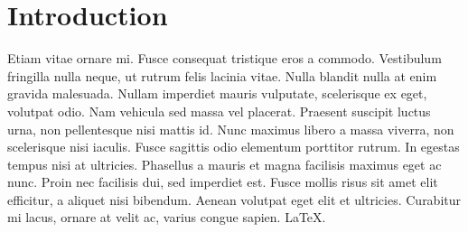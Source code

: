 \section{Introduction}
Etiam vitae ornare mi. Fusce consequat tristique eros a commodo. Vestibulum fringilla nulla neque, ut rutrum felis lacinia vitae. Nulla blandit nulla at enim gravida malesuada. Nullam imperdiet mauris vulputate, scelerisque ex eget, volutpat odio. Nam vehicula sed massa vel placerat. Praesent suscipit luctus urna, non pellentesque nisi mattis id. Nunc maximus libero a massa viverra, non scelerisque nisi iaculis. Fusce sagittis odio elementum porttitor rutrum. In egestas tempus nisi at ultricies. Phasellus a mauris et magna facilisis maximus eget ac nunc. Proin nec facilisis dui, sed imperdiet est. Fusce mollis risus sit amet elit efficitur, a aliquet nisi bibendum. Aenean volutpat eget elit et ultricies. Curabitur mi lacus, ornare at velit ac, varius congue sapien. \LaTeX.